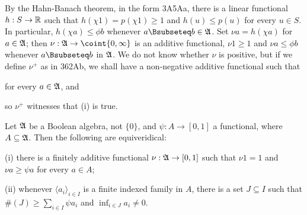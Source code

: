 {By the Hahn-Banach theorem, in the form 3A5Aa, there is a linear
functional $h:S\to\Bbb R$ such that $h(\chi 1)=p(\chi 1)\ge 1$ and
$h(u)\le p(u)$ for
every $u\in S$.   In particular, $h(\chi a)\le\phi b$ whenever
$a\Bsubseteq b\in\frak A$.   Set $\nu a=h(\chi a)$ for $a\in\frak A$;
then $\nu:\frak A\to\coint{0,\infty}$ is an additive functional,
$\nu 1\ge 1$ and
$\nu a\le\phi b$ whenever $a\Bsubseteq b$ in $\frak A$.   We do not know
whether $\nu$ is positive, but if we define $\nu^+$ as in 362Ab, we
shall have a non-negative additive functional such that


\noindent for every $a\in\frak A$, and


\noindent so $\nu^+$ witnesses that (i) is true.
}%

 Let $\frak A$ be a Boolean algebra, not $\{0\}$,
and $\psi:A\to[0,1]$ a functional, where $A\subseteq\frak A$.   Then the
following are equiveridical:

(i) there is a finitely additive functional
$\nu:\frak A\to[0,1]$ such that $\nu 1=1$ and $\nu a\ge\psi a$ for every
$a\in A$;

(ii) whenever $\langle a_i\rangle_{i\in I}$ is a finite indexed family
in $A$, there is a set $J\subseteq I$ such that
$\#(J)\ge\sum_{i\in I}\psi a_i$ and $\inf_{i\in J}a_i\ne 0$.


